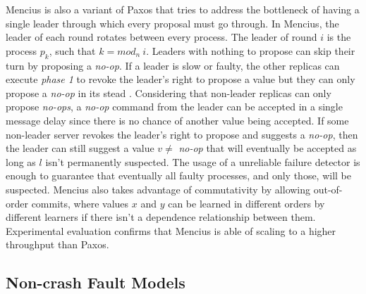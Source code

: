 \documentclass[runningheads,a4paper]{llncs}
\begin{document}
Mencius is also a variant of Paxos that tries to address the bottleneck of having a single leader through which every proposal must go through. In Mencius, the leader of each round rotates between every process. The leader of round $i$ is the process $p_k$, such that $k = mod_n\ i$.  Leaders with nothing to propose can skip their turn by proposing a \textit{no-op}. If a leader is slow or faulty, the other replicas can execute \textit{phase 1} to revoke the leader's right to propose a value but they can only propose a \textit{no-op} in its stead \cite{Mao2008}. Considering that non-leader replicas can only propose \textit{no-ops}, a \textit{no-op} command from the leader can be accepted in a single message delay since there is no chance of another value being accepted. If some non-leader server revokes the leader's right to propose and suggests a \textit{no-op}, then the leader can still suggest a value $v \neq$ \textit{no-op} that will eventually be accepted as long as $l$ isn't permanently suspected. The usage of a unreliable failure detector is enough to guarantee that eventually all faulty processes, and only those, will be suspected. Mencius also takes advantage of commutativity by allowing out-of-order commits, where values $x$ and $y$ can be learned in different orders by different learners if there isn't a dependence relationship between them. Experimental evaluation confirms that Mencius is able of scaling to a higher throughput than Paxos.

\subsection{Non-crash Fault Models}
\end{document}
